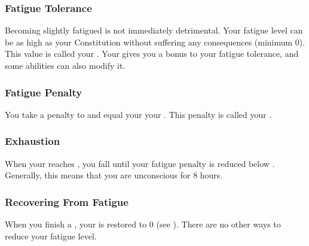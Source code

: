             \subsubsection{Fatigue Tolerance}\label{Fatigue Tolerance}
                Becoming slightly fatigued is not immediately detrimental.
                Your fatigue level can be as high as your Constitution without suffering any consequences (minimum 0).
                This value is called your .
                Your  gives you a bonus to your fatigue tolerance, and some abilities can also modify it.

            \subsubsection{Fatigue Penalty}\label{Fatigue Penalty}
                You take a penalty to  and  equal your  \sub your .
                This penalty is called your .

        \subsubsection{Exhaustion}\label{Exhaustion}
            When your  reaches , you fall \unconscious until your fatigue penalty is reduced below .
            Generally, this means that you are unconscious for 8 hours.

        \subsubsection{Recovering From Fatigue}
            When you finish a , your  is restored to 0 (see ).
            There are no other ways to reduce your fatigue level.



